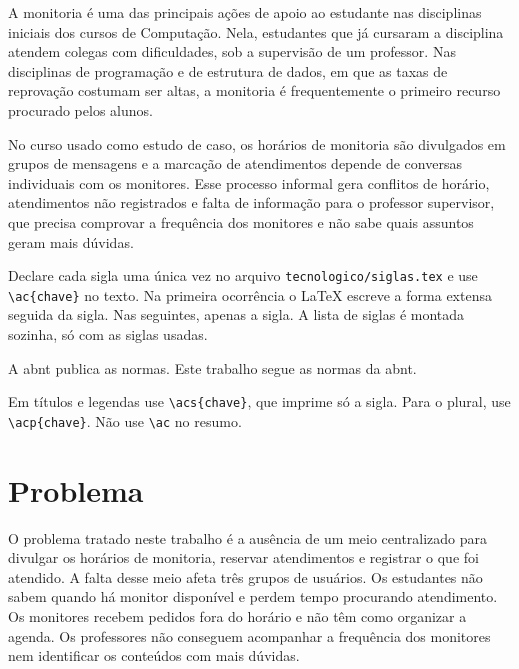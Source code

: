 A monitoria é uma das principais ações de apoio ao estudante nas disciplinas
iniciais dos cursos de Computação. Nela, estudantes que já cursaram a
disciplina atendem colegas com dificuldades, sob a supervisão de um professor.
Nas disciplinas de programação e de estrutura de dados, em que as taxas de
reprovação costumam ser altas, a monitoria é frequentemente o primeiro recurso
procurado pelos alunos.

No curso usado como estudo de caso, os horários de monitoria são divulgados em
grupos de mensagens e a marcação de atendimentos depende de conversas
individuais com os monitores. Esse processo informal gera conflitos de
horário, atendimentos não registrados e falta de informação para o professor
supervisor, que precisa comprovar a frequência dos monitores e não sabe quais
assuntos geram mais dúvidas.

\begin{instrucao}
Declare cada sigla uma única vez no arquivo \verb|tecnologico/siglas.tex| e use
\verb|\ac{chave}| no texto. Na primeira ocorrência o LaTeX escreve a forma
extensa seguida da sigla. Nas seguintes, apenas a sigla. A lista de siglas é
montada sozinha, só com as siglas usadas.
\begin{exemplo}
A \ac{abnt} publica as normas.
Este trabalho segue as
normas da \ac{abnt}.
\end{exemplo}
Em títulos e legendas use \verb|\acs{chave}|, que imprime só a sigla. Para o
plural, use \verb|\acp{chave}|. Não use \verb|\ac| no resumo.
\end{instrucao}

\section{Problema}
\label{sec:introducao:problema}

O problema tratado neste trabalho é a ausência de um meio centralizado para
divulgar os horários de monitoria, reservar atendimentos e registrar o que foi
atendido. A falta desse meio afeta três grupos de usuários. Os estudantes não
sabem quando há monitor disponível e perdem tempo procurando atendimento. Os
monitores recebem pedidos fora do horário e não têm como organizar a agenda. Os
professores não conseguem acompanhar a frequência dos monitores nem identificar
os conteúdos com mais dúvidas.

